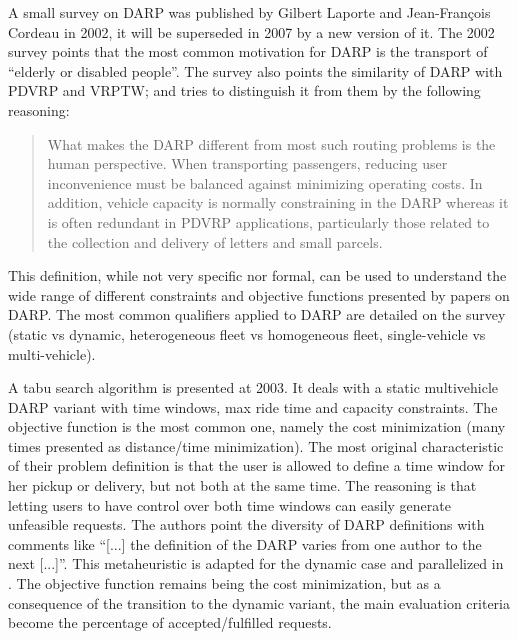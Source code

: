 \documentclass[english,plano-doutorado,twoside]{iiufrgs}
\begin{document}
A small survey on DARP was published by Gilbert Laporte and Jean-François Cordeau in 2002\cite{cordeau_survey_2002}, it will be superseded in 2007 by a new version of it\cite{cordeau_dial_ride_2007}. The 2002 survey points that the most common motivation for DARP is the transport of ``elderly or disabled people''. The survey also points the similarity of DARP with PDVRP and VRPTW; and tries to distinguish it from them by the following reasoning:
\begin{quotation}
What makes the DARP different from most such routing problems is the human perspective. When transporting passengers, reducing user inconvenience must be balanced against minimizing operating costs. In addition, vehicle capacity is normally constraining in the DARP whereas it is often redundant in PDVRP applications, particularly those related to the collection and delivery of letters and small parcels.
\end{quotation}
This definition, while not very specific nor formal, can be used to understand the wide range of different constraints and objective functions presented by papers on DARP. The most common qualifiers applied to DARP are detailed on the survey (static vs dynamic, heterogeneous fleet vs homogeneous fleet, single-vehicle vs multi-vehicle).

A tabu search algorithm is presented at 2003\cite{cordeau_tabu_2003}. It deals with a static multivehicle DARP variant with time windows, max ride time and capacity constraints. The objective function is the most common one, namely the cost minimization (many times presented as distance/time minimization). The most original characteristic of their problem definition is that the user is allowed to define a time window for her pickup or delivery, but not both at the same time. The reasoning is that letting users to have control over both time windows can easily generate unfeasible requests. The authors point the diversity of DARP definitions with comments like ``[...] the definition of the DARP varies from one author to the next [...]''. This metaheuristic is adapted for the dynamic case and parallelized in \cite{attanasio_parallel_2004}. The objective function remains being the cost minimization, but as a consequence of the transition to the dynamic variant, the main evaluation criteria become the percentage of accepted/fulfilled requests.
\end{document}
